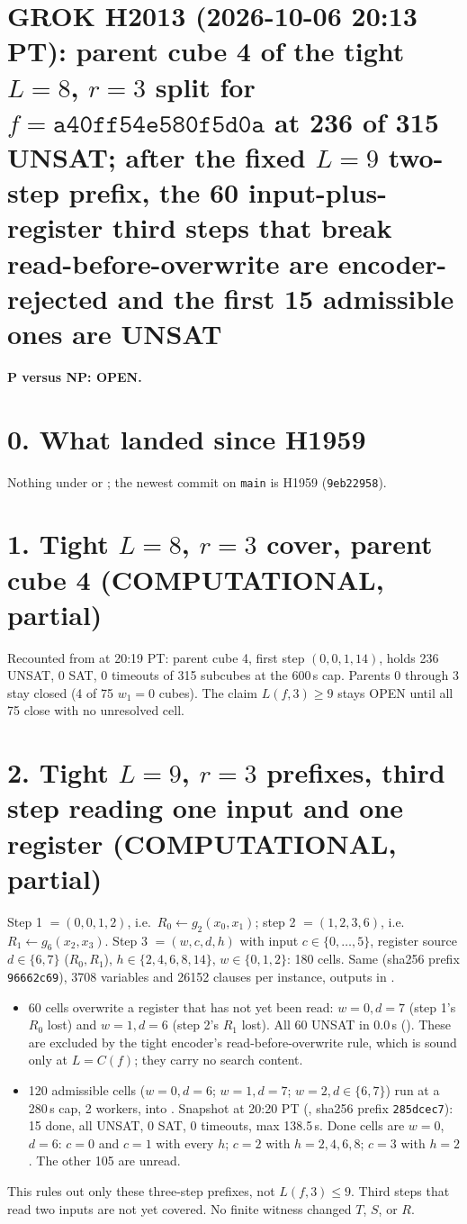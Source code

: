 \documentclass[11pt]{article}
\begin{document}
\sloppy
\section*{GROK H2013 (2026-10-06 20:13 PT): parent cube 4 of the tight $L=8$, $r=3$ split for $f=\texttt{a40ff54e580f5d0a}$ at 236 of 315 UNSAT; after the fixed $L=9$ two-step prefix, the 60 input-plus-register third steps that break read-before-overwrite are encoder-rejected and the first 15 admissible ones are UNSAT}
\textbf{P versus NP: OPEN.}

\section*{0. What landed since H1959}
Nothing under  or ; the newest commit on \texttt{main} is H1959 (\texttt{9eb22958}).

\section*{1. Tight $L=8$, $r=3$ cover, parent cube 4 (COMPUTATIONAL, partial)}
Recounted from  at 20:19 PT: parent cube 4, first step $(0,0,1,14)$, holds 236 UNSAT, 0 SAT, 0 timeouts of 315 subcubes at the 600\,s cap. Parents 0 through 3 stay closed (4 of 75 $w_1=0$ cubes). The claim $L(f,3)\ge 9$ stays OPEN until all 75 close with no unresolved cell.

\section*{2. Tight $L=9$, $r=3$ prefixes, third step reading one input and one register (COMPUTATIONAL, partial)}
Step 1 $=(0,0,1,2)$, i.e.\ $R_0\leftarrow g_2(x_0,x_1)$; step 2 $=(1,2,3,6)$, i.e.\ $R_1\leftarrow g_6(x_2,x_3)$. Step 3 $=(w,c,d,h)$ with input $c\in\{0,\dots,5\}$, register source $d\in\{6,7\}$ ($R_0,R_1$), $h\in\{2,4,6,8,14\}$, $w\in\{0,1,2\}$: 180 cells. Same  (sha256 prefix \texttt{96662c69}), 3708 variables and 26152 clauses per instance, outputs in .
\begin{itemize}
\item 60 cells overwrite a register that has not yet been read: $w=0,d=7$ (step 1's $R_0$ lost) and $w=1,d=6$ (step 2's $R_1$ lost). All 60 UNSAT in 0.0\,s (). These are excluded by the tight encoder's read-before-overwrite rule, which is sound only at $L=C(f)$; they carry no search content.
\item 120 admissible cells ($w=0,d=6$; $w=1,d=7$; $w=2,d\in\{6,7\}$) run at a 280\,s cap, 2 workers, into . Snapshot at 20:20 PT (, sha256 prefix \texttt{285dcec7}): 15 done, all UNSAT, 0 SAT, 0 timeouts, max 138.5\,s. Done cells are $w=0$, $d=6$: $c=0$ and $c=1$ with every $h$; $c=2$ with $h=2,4,6,8$; $c=3$ with $h=2$. The other 105 are unread.
\end{itemize}
This rules out only these three-step prefixes, not $L(f,3)\le 9$. Third steps that read two inputs are not yet covered. No finite witness changed $T$, $S$, or $R$.
\end{document}
